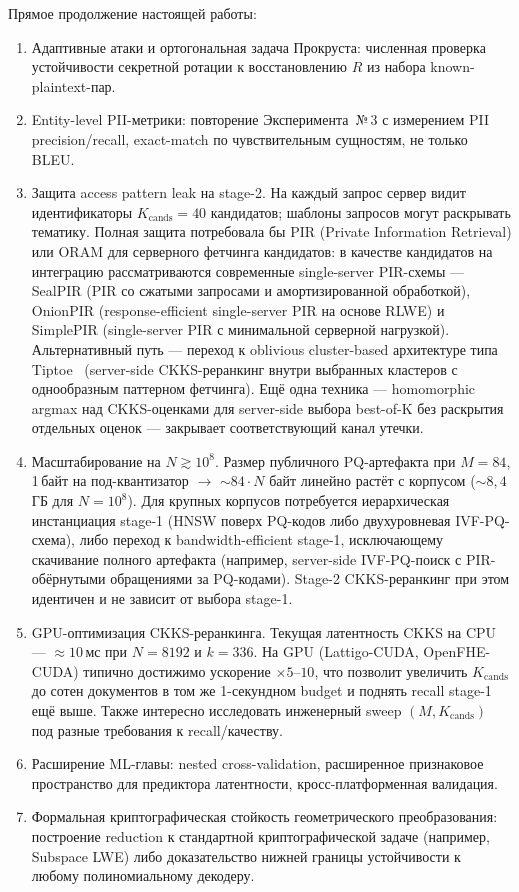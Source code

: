 \documentclass[a4paper, 12pt, oneside, openany]{article}
\begin{document}
Прямое продолжение настоящей работы:
\begin{enumerate}
\item Адаптивные атаки и ортогональная задача Прокруста: численная проверка устойчивости секретной ротации к восстановлению $R$ из набора known-plaintext-пар.
\item Entity-level PII-метрики: повторение Эксперимента~№\,3 с измерением PII precision/recall, exact-match по чувствительным сущностям, не только BLEU.
\item Защита access pattern leak на stage-2. На каждый запрос сервер видит идентификаторы $K_{\mathrm{cands}} = 40$ кандидатов; шаблоны запросов могут раскрывать тематику. Полная защита потребовала бы PIR (Private Information Retrieval) или ORAM для серверного фетчинга кандидатов: в качестве кандидатов на интеграцию рассматриваются современные single-server PIR-схемы --- SealPIR \cite{ref70} (PIR со сжатыми запросами и амортизированной обработкой), OnionPIR \cite{ref73} (response-efficient single-server PIR на основе RLWE) и SimplePIR \cite{ref71} (single-server PIR с минимальной серверной нагрузкой). Альтернативный путь --- переход к oblivious cluster-based архитектуре типа Tiptoe~\cite{ref72} (server-side CKKS-реранкинг внутри выбранных кластеров с однообразным паттерном фетчинга). Ещё одна техника --- homomorphic argmax над CKKS-оценками для server-side выбора best-of-K без раскрытия отдельных оценок --- закрывает соответствующий канал утечки.

\item Масштабирование на $N \gtrsim 10^{8}$. Размер публичного PQ-артефакта при $M = 84$, 1\,байт на под-квантизатор $\to$ $\sim 84 \cdot N$ байт линейно растёт с корпусом ($\sim 8{,}4$\,ГБ для $N = 10^{8}$). Для крупных корпусов потребуется иерархическая инстанциация stage-1 (HNSW поверх PQ-кодов либо двухуровневая IVF-PQ-схема), либо переход к bandwidth-efficient stage-1, исключающему скачивание полного артефакта (например, server-side IVF-PQ-поиск с PIR-обёрнутыми обращениями за PQ-кодами). Stage-2 CKKS-реранкинг при этом идентичен и не зависит от выбора stage-1.

\item GPU-оптимизация CKKS-реранкинга. Текущая латентность CKKS на CPU --- $\approx 10$\,мс при $N = 8192$ и $k = 336$. На GPU (Lattigo-CUDA, OpenFHE-CUDA) типично достижимо ускорение $\times 5$--$10$, что позволит увеличить $K_{\mathrm{cands}}$ до сотен документов в том же 1-секундном budget и поднять recall stage-1 ещё выше. Также интересно исследовать инженерный sweep $(M, K_{\mathrm{cands}})$ под разные требования к recall/качеству.
\item Расширение ML-главы: nested cross-validation, расширенное признаковое пространство для предиктора латентности, кросс-платформенная валидация.
\item Формальная криптографическая стойкость геометрического преобразования: построение reduction к стандартной криптографической задаче (например, Subspace LWE) либо доказательство нижней границы устойчивости к любому полиномиальному декодеру.


\end{enumerate}
\end{document}
